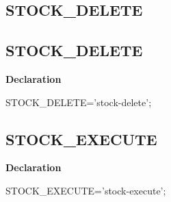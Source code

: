 \documentclass{report}
\newif\ifpdf
\begin{document}
\subsection*{\large{\textbf{STOCK{\_}DELETE}}\normalsize\hspace{1ex}\hrulefill}
\else
\subsection*{STOCK{\_}DELETE}
\fi
\label{common-STOCK_DELETE}
\begin{list}{}{
\setlength{\itemindent}{0cm}
\setlength{\listparindent}{0cm}
\setlength{\leftmargin}{\evensidemargin}
\addtolength{\leftmargin}{\tmplength}
\settowidth{\labelsep}{X}
\addtolength{\leftmargin}{\labelsep}
\setlength{\labelwidth}{\tmplength}
}
\item[\textbf{Declaration}\hfill]
\ifpdf
\begin{flushleft}
\fi
\begin{ttfamily}
STOCK{\_}DELETE='stock-delete';\end{ttfamily}

\ifpdf
\end{flushleft}
\fi

\end{list}
\ifpdf
\subsection*{\large{\textbf{STOCK{\_}EXECUTE}}\normalsize\hspace{1ex}\hrulefill}
\else
\subsection*{STOCK{\_}EXECUTE}
\fi
\label{common-STOCK_EXECUTE}
\begin{list}{}{
\setlength{\itemindent}{0cm}
\setlength{\listparindent}{0cm}
\setlength{\leftmargin}{\evensidemargin}
\addtolength{\leftmargin}{\tmplength}
\settowidth{\labelsep}{X}
\addtolength{\leftmargin}{\labelsep}
\setlength{\labelwidth}{\tmplength}
}
\item[\textbf{Declaration}\hfill]
\ifpdf
\begin{flushleft}
\fi
\begin{ttfamily}
STOCK{\_}EXECUTE='stock-execute';\end{ttfamily}

\ifpdf
\end{flushleft}
\fi

\end{list}
\ifpdf
\end{document}
